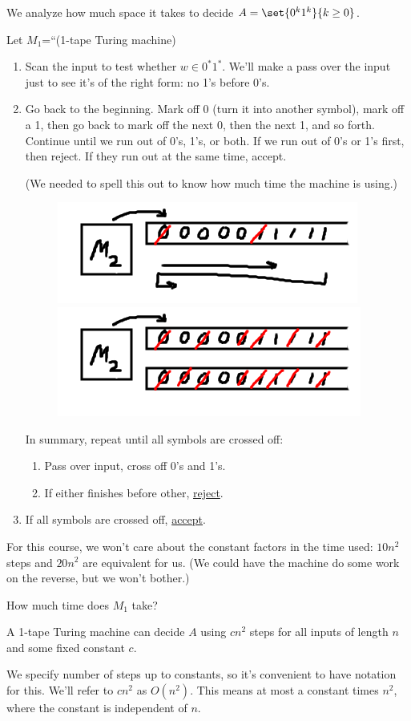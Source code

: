\begin{ex}
We analyze how much space it takes to decide $A=\set{0^k1^k}{k\ge 0}$.

Let $M_1$=``(1-tape Turing machine) 
\begin{enumerate}
\item
Scan the input to test whether $w\in 0^*1^*$. We'll make a pass over the input just to see it's of the right form: no 1's before 0's. %
\item Go back to the beginning. Mark off 0 (turn it into another symbol), mark off a 1, then go back to mark off the next 0, then the next 1, and so forth. Continue until we run out of 0's, 1's, or both. If we run out of 0's or 1's first, then reject. If they run out at the same time, accept.

(We needed to spell this out to know how much time the machine is using.)

\begin{center}
\begin{figure}[h!]
\includegraphics[scale=1.0]{12-1}
\qquad
\includegraphics[scale=1.0]{12-2}
\end{figure}
\end{center}

In summary, repeat until all symbols are crossed off:
\begin{enumerate}
\item
Pass over input, cross off 0's and 1's.
\item
If either finishes before other, \ul{reject}.
\end{enumerate}
\item If all symbols are crossed off, \ul{accept}.
\end{enumerate}
For this course, we won't care about the constant factors in the time used: $10n^2$ steps and $20n^2$ are equivalent for us. (We could have the machine do some work on the reverse, but we won't bother.)

How much time does $M_1$ take?
\end{ex}
\begin{thm}
A 1-tape Turing machine can decide $A$ using $cn^2$ steps for all inputs of length $n$ and some fixed constant $c$. 
\end{thm}
We specify number of steps up to constants, so it's convenient to have notation for this. 
We'll refer to $cn^2$ as $O(n^2)$. This means at most a constant times $n^2$, where the constant is independent of $n$.

